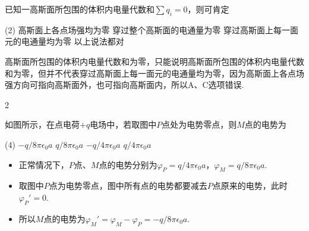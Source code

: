 \begin{problem}
    已知一高斯面所包围的体积内电量代数和$\sum{q_i}=0$，则可肯定
    \begin{tasks}(2)
        \task 高斯面上各点场强均为零
        \task 穿过整个高斯面的电通量为零
        \task 穿过高斯面上每一面元的电通量均为零
        \task 以上说法都对
    \end{tasks}
\end{problem}
\begin{solution}
    高斯面所包围的体积内电量代数和为零，只能说明高斯面所包围的体积内电量代数和为零，但并不代表穿过高斯面上每一面元的电通量均为零，因为高斯面上各点场强方向可指向高斯面外，也可指向高斯面内，所以A、C选项错误.
\end{solution}

\begin{paracol}{2}
    \begin{problem}
        如图所示，在点电荷$+q$电场中，若取图中$P$点处为电势零点，则$M$点的电势为
        \begin{tasks}(4)
            \task[\true] $-q/8\pi\epsilon_0a$
            \task $q/8\pi\epsilon_0a$
            \task $-q/4\pi\epsilon_0a$
            \task $q/4\pi\epsilon_0a$
        \end{tasks}
    \end{problem}
    \switchcolumn\vspace*{\fill}\centering
    \vspace*{\fill}
\end{paracol}
\begin{solution}\leavevmode
    \begin{itemize}
        \item 正常情况下，$P$点、$M$点的电势分别为$\varphi_P=q/4\pi\epsilon_0a$，$\varphi_M=q/8\pi\epsilon_0a$.
        \item 取图中$P$点为电势零点，图中所有点的电势都要减去$P$点原来的电势，此时$\varphi_P'=0$.
        \item 所以$M$点的电势为$\varphi_M'=\varphi_M-\varphi_P=-q/8\pi\epsilon_0a$.
    \end{itemize}
\end{solution}

